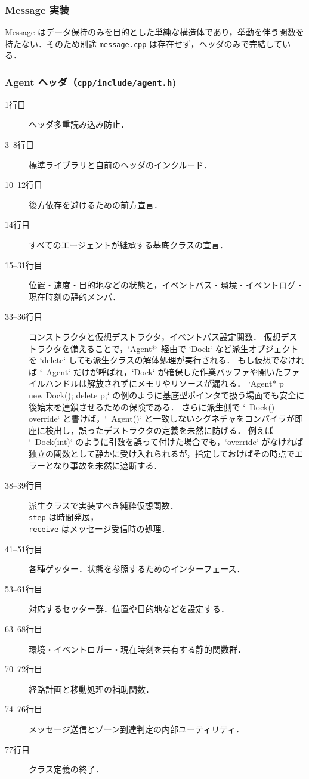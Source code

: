 \documentclass[10pt,letterpaper]{jsarticle}
\begin{document}
\subsubsection{Message 実装}
Message はデータ保持のみを目的とした単純な構造体であり，挙動を伴う関数を持たない．そのため別途 \texttt{message.cpp} は存在せず，ヘッダのみで完結している．

\subsubsection{Agent ヘッダ（\texttt{cpp/include/agent.h})}

\begin{description}
  \item[1行目] ヘッダ多重読み込み防止．
  \item[3--8行目] 標準ライブラリと自前のヘッダのインクルード．
  \item[10--12行目] 後方依存を避けるための前方宣言．
  \item[14行目] すべてのエージェントが継承する基底クラスの宣言．
  \item[15--31行目] 位置・速度・目的地などの状態と，イベントバス・環境・イベントログ・現在時刻の静的メンバ．
  \item[33--36行目] コンストラクタと仮想デストラクタ，イベントバス設定関数．
  仮想デストラクタを備えることで，`Agent*` 経由で `Dock` など派生オブジェクトを `delete` しても派生クラスの解体処理が実行される．
  もし仮想でなければ `~Agent` だけが呼ばれ，`Dock` が確保した作業バッファや開いたファイルハンドルは解放されずにメモリやリソースが漏れる．
  `Agent* p = new Dock(); delete p;` の例のように基底型ポインタで扱う場面でも安全に後始末を連鎖させるための保険である．
  さらに派生側で `~Dock() override` と書けば，`~Agent()` と一致しないシグネチャをコンパイラが即座に検出し，誤ったデストラクタの定義を未然に防げる．
  例えば `~Dock(int)` のように引数を誤って付けた場合でも，`override` がなければ独立の関数として静かに受け入れられるが，指定しておけばその時点でエラーとなり事故を未然に遮断する．

  \item[38--39行目] 派生クラスで実装すべき純粋仮想関数．\\\texttt{step} は時間発展，\\\texttt{receive} はメッセージ受信時の処理．
  \item[41--51行目] 各種ゲッター．状態を参照するためのインターフェース．
  \item[53--61行目] 対応するセッター群．位置や目的地などを設定する．
  \item[63--68行目] 環境・イベントロガー・現在時刻を共有する静的関数群．
  \item[70--72行目] 経路計画と移動処理の補助関数．
  \item[74--76行目] メッセージ送信とゾーン到達判定の内部ユーティリティ．
  \item[77行目] クラス定義の終了．
\end{description}
\end{document}

